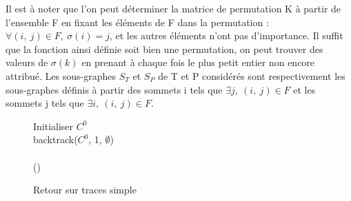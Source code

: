 Il est à noter que l'on peut déterminer la matrice de permutation K à partir de l'ensemble F en fixant les éléments de F dans la permutation : $\forall (i,\ j)\in F,\ \sigma(i)=j$, et les autres
éléments n'ont pas d'importance. Il suffit que la fonction ainsi définie soit bien une permutation, on peut trouver des valeurs de $\sigma(k)$ en prenant à chaque fois le plus petit entier
non encore attribué. Les sous-graphes $S_T$ et $S_P$ de T et P considérés sont respectivement les sous-graphes définis à partir des sommets i tels que $\exists j,\ (i,\ j)\in F$ et les sommets j tels que
$\exists i,\ (i,\ j)\in F$.

\begin{figure}[h]
\begin{algorithm}[H] %
\caption{Retour sur traces simple}
\SetAlgoLined
{}
Initialiser $C^0$\\
backtrack($C^0$, 1, $\emptyset$)\\
~\\
\Fn(){}{
}
\label{algo:ullman}
\end{algorithm}
\end{figure}

